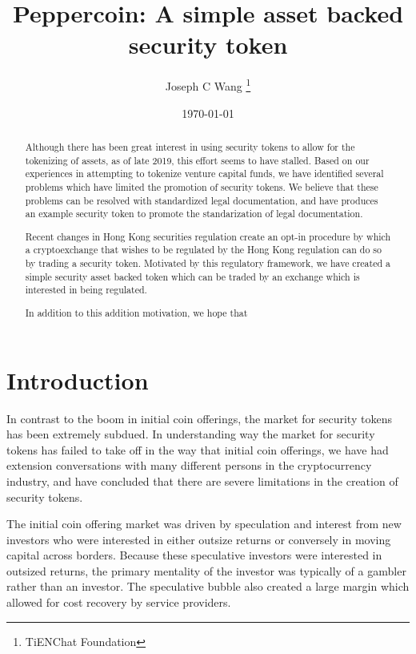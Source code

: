 \documentclass[journal]{IEEEtran}
\begin{document}
\title{Peppercoin: A simple asset backed security token}
\author{Joseph C Wang \thanks{TiENChat Foundation}}
\date{\today}

\maketitle

\begin{abstract}

Although there has been great interest in using security tokens to
allow for the tokenizing of assets, as of late 2019, this effort seems
to have stalled.  Based on our experiences in attempting to tokenize
venture capital funds, we have identified several problems which have
limited the promotion of security tokens.  We believe that these
problems can be resolved with standardized legal documentation, and
have produces an example security token to promote the standarization
of legal documentation.

Recent changes in Hong Kong securities regulation create an opt-in
procedure by which a cryptoexchange that wishes to be regulated by the
Hong Kong regulation can do so by trading a security token.  Motivated
by this regulatory framework, we have created a simple security asset
backed token which can be traded by an exchange which is interested in
being regulated.

In addition to this addition motivation, we hope that 
\end{abstract}

\section{Introduction}
In contrast to the boom in initial coin offerings, the market for
security tokens has been extremely subdued.  In understanding way the
market for security tokens has failed to take off in the way that
initial coin offerings, we have had extension conversations with many
different persons in the cryptocurrency industry, and have concluded
that there are severe limitations in the creation of security tokens.

The initial coin offering market was driven by speculation and
interest from new investors who were interested in either outsize
returns or conversely in moving capital across borders.  Because these
speculative investors were interested in outsized returns, the primary
mentality of the investor was typically of a gambler rather than an
investor.  The speculative bubble also created a large margin which
allowed for cost recovery by service providers.
\end{document}
